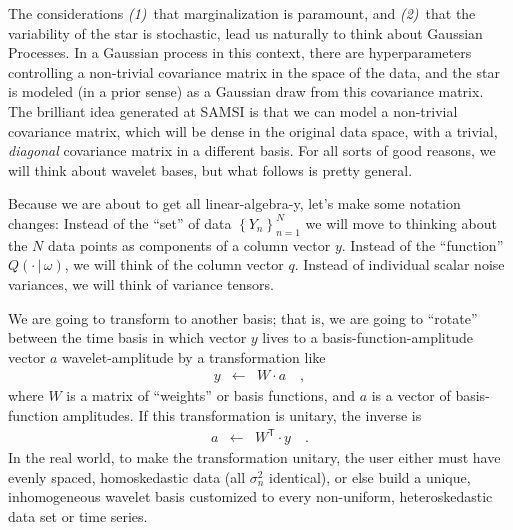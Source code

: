 \documentclass[12pt,letterpaper]{article}
\newcommand{\given}{\,|\,}
\newcommand{\setof}[1]{\left\{{#1}\right\}}
\newcommand{\transpose}[1]{{#1}^{\mathsf{T}}}
\newcommand{\datum}{Y}
\newcommand{\data}{\setof{\datum_n}_{n=1}^N}
\newcommand{\datavec}{y}
\newcommand{\exofn}{Q}
\newcommand{\exovec}{q}
\newcommand{\exopars}{\omega}
\newcommand{\variance}{\sigma^2}
\newcommand{\wavevec}{a}
\newcommand{\weightmatrix}{W}
\begin{document}
The considerations \textsl{(1)}~that marginalization is paramount,
and \textsl{(2)}~that the variability of the star is stochastic,
lead us naturally to think about Gaussian Processes.
In a Gaussian process in this context,
there are hyperparameters controlling a non-trivial covariance matrix in the space of the data,
and the star is modeled (in a prior sense) as a Gaussian draw from this covariance matrix.
The brilliant idea generated at SAMSI is that we can model a non-trivial covariance matrix,
which will be dense in the original data space,
with a trivial, \emph{diagonal} covariance matrix in a different basis.
For all sorts of good reasons, we will think about wavelet bases,
but what follows is pretty general.

Because we are about to get all linear-algebra-y, let's make some
notation changes: Instead of the ``set'' of data $\data$ we will move
to thinking about the $N$ data points as components of a column vector
$\datavec$.  Instead of the ``function'' $\exofn(\cdot\given\exopars)$,
we will think of the column vector $\exovec$.
Instead of individual scalar noise variances,
we will think of variance tensors.

We are going to transform to another basis;
that is, we are going to ``rotate'' between the time basis in which vector $y$ lives
to a basis-function-amplitude vector $\wavevec$ wavelet-amplitude by a transformation like
\begin{eqnarray}
\datavec
  &\leftarrow& \weightmatrix\cdot\wavevec
\quad ,
\end{eqnarray}
where $\weightmatrix$ is a matrix of ``weights'' or basis functions,
and $\wavevec$ is a vector of basis-function amplitudes.
If this transformation is unitary, the inverse is
\begin{eqnarray}
\wavevec
  &\leftarrow& \transpose{\weightmatrix}\cdot\datavec
\quad .
\end{eqnarray}
In the real world, to make the transformation unitary,
the user either must have evenly spaced, homoskedastic data (all $\variance_n$ identical),
or else build a unique, inhomogeneous wavelet basis
customized to every non-uniform, heteroskedastic data set or time series.
\end{document}
